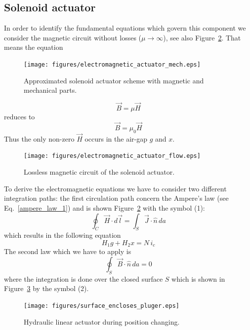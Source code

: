 \documentclass[11pt,a4paper,oneside]{book}
\numberwithin{equation}{section}
\theoremstyle{it}
\theoremstyle{definition}
\begin{document}
\subsection{Solenoid actuator}
In order to identify the fundamental equations which govern this component we consider the magnetic circuit without losses ($\mu\rightarrow\infty$), see also Figure~\ref{solenoid_magnetic_1}. That means the equation 
\begin{figure}[H]
	\centering
	\texttt{[image: figures/electromagnetic\_actuator\_mech.eps]}
	\captionsetup{width=0.75\textwidth}		
	\caption{Approximated solenoid actuator scheme with magnetic and mechanical parts.}
	\label{solenoid_mech_1}
\end{figure}
\begin{equation}\label{lossless_1}
	\vec{B}=\mu\vec{H}
\end{equation}
reduces to 
\begin{equation}\label{lossless_2}
	\vec{B}=\mu_0\vec{H}
\end{equation}
Thus the only non-zero $\vec{H}$ occurs in the air-gap $g$ and $x$.
\begin{figure}[H]
	\centering
	\texttt{[image: figures/electromagnetic\_actuator\_flow.eps]}
	\captionsetup{width=0.75\textwidth}		
	\caption{Lossless magnetic circuit of the solenoid actuator.}
	\label{solenoid_magnetic_1}
\end{figure}
To derive the electromagnetic equations we have to consider two different integration paths: the first circulation path concern the Ampere's law (see Eq.~\eqref{ampere_law_1}) and is shown Figure~\ref{solenoid_magnetic_1} with the symbol (1):
\begin{equation}\label{ampere_law_1}
	\oint_{C}\vec{H}\cdot d\vec{l}=\int_{S}\vec{J}\cdot\hat{n}\,da
\end{equation}
which results in the following equation
\begin{equation}\label{ampere_law_2}
	H_1g+H_2x=N\,i_c
\end{equation}
The second law which we have to apply is
\begin{equation}\label{gauss_law_magnetic_1}
	\oint_{S}\vec{B}\cdot\hat{n}\,da=0
\end{equation}
where the integration is done over the closed surface $S$ which is shown in Figure~\ref{solenoid_magnetic_2} by the symbol (2). 
\begin{figure}[H]
	\centering
	\texttt{[image: figures/surface\_encloses\_pluger.eps]}
	\captionsetup{width=0.75\textwidth}		
	\caption{Hydraulic linear actuator during position changing.}
	\label{solenoid_magnetic_2}
\end{figure}
\end{document}
